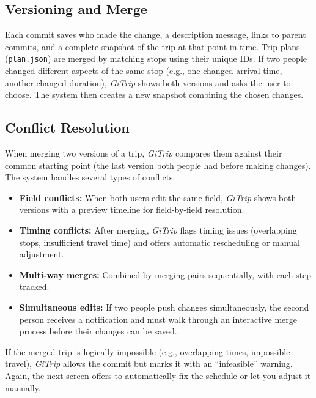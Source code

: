 \documentclass{article}
\begin{document}
\subsection{Versioning and Merge}

Each commit saves who made the change, a description message, links to parent commits, and a complete snapshot of the trip at that point in time. Trip plans (\texttt{plan.json}) are merged by matching stops using their unique IDs. If two people changed different aspects of the same stop (e.g., one changed arrival time, another changed duration), \textit{GiTrip} shows both versions and asks the user to choose. The system then creates a new snapshot combining the chosen changes.

\subsection{Conflict Resolution}

When merging two versions of a trip, \textit{GiTrip} compares them against their common starting point (the last version both people had before making changes). The system handles several types of conflicts:
\begin{itemize}
  \item \textbf{Field conflicts:} When both users edit the same field, \textit{GiTrip} shows both versions with a preview timeline for field-by-field resolution.
  
  \item \textbf{Timing conflicts:} After merging, \textit{GiTrip} flags timing issues (overlapping stops, insufficient travel time) and offers automatic rescheduling or manual adjustment.
  
  \item \textbf{Multi-way merges:} Combined by merging pairs sequentially, with each step tracked.
  
  \item \textbf{Simultaneous edits:} If two people push changes simultaneously, the second person receives a notification and must walk through an interactive merge process before their changes can be saved.
\end{itemize}

If the merged trip is logically impossible (e.g., overlapping times, impossible travel), \textit{GiTrip} allows the commit but marks it with an ``infeasible'' warning. Again, the next screen offers to automatically fix the schedule or let you adjust it manually.
\end{document}
